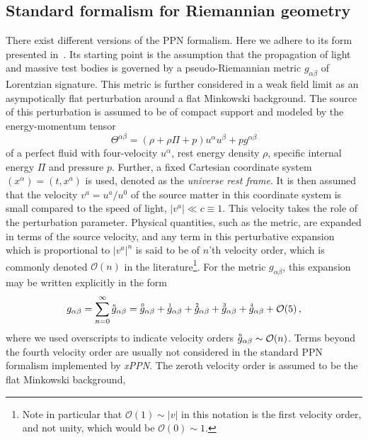 \documentclass[notitlepage,a4paper,aps,prd,onecolumn,superscriptaddress,nofootinbib,groupedaddress,longbibliography]{revtex4-1}
\newcommand{\order}[2]{\accentset{#2}{#1}}
\newcommand{\xPPN}{\emph{xPPN}}
\begin{document}
\subsection{Standard formalism for Riemannian geometry}\label{ssec:ppncurv}
There exist different versions of the PPN formalism. Here we adhere to its form presented in~\cite{Will:1993ns}. Its starting point is the assumption that the propagation of light and massive test bodies is governed by a pseudo-Riemannian metric \(g_{\alpha\beta}\) of Lorentzian signature. This metric is further considered in a weak field limit as an asympotically flat perturbation around a flat Minkowski background. The source of this perturbation is assumed to be of compact support and modeled by the energy-momentum tensor
\begin{equation}\label{eq:fluid}
\Theta^{\alpha\beta} = (\rho + \rho\Pi + p)u^{\alpha}u^{\beta} + pg^{\alpha\beta}
\end{equation}
of a perfect fluid with four-velocity \(u^{\alpha}\), rest energy density \(\rho\), specific internal energy \(\Pi\) and pressure \(p\). Further, a fixed Cartesian coordinate system \((x^{\alpha}) = (t, x^a)\) is used, denoted as the \emph{universe rest frame}. It is then assumed that the velocity \(v^a = u^a/u^0\) of the source matter in this coordinate system is small compared to the speed of light, \(|v^a| \ll c \equiv 1\). This velocity takes the role of the perturbation parameter. Physical quantities, such as the metric, are expanded in terms of the source velocity, and any term in this perturbative expansion which is proportional to \(|v^a|^n\) is said to be of $n$'th velocity order, which is commonly denoted \(\mathcal{O}(n)\) in the literature\footnote{Note in particular that \(\mathcal{O}(1) \sim |v|\) in this notation is the first velocity order, and not unity, which would be \(\mathcal{O}(0) \sim 1\).}. For the metric \(g_{\alpha\beta}\), this expansion may be written explicitly in the form
\begin{equation}\label{eq:metvelord}
g_{\alpha\beta} = \sum_{n = 0}^{\infty}\order{g}{n}_{\alpha\beta} = \order{g}{0}_{\alpha\beta} + \order{g}{1}_{\alpha\beta} + \order{g}{2}_{\alpha\beta} + \order{g}{3}_{\alpha\beta} + \order{g}{4}_{\alpha\beta} + \mathcal{O}(5)\,,
\end{equation}
where we used overscripts to indicate velocity orders \(\order{g}{n}_{\alpha\beta} \sim \mathcal{O}(n)\). Terms beyond the fourth velocity order are usually not considered in the standard PPN formalism implemented by \xPPN. The zeroth velocity order is assumed to be the flat Minkowski background,
\end{document}
